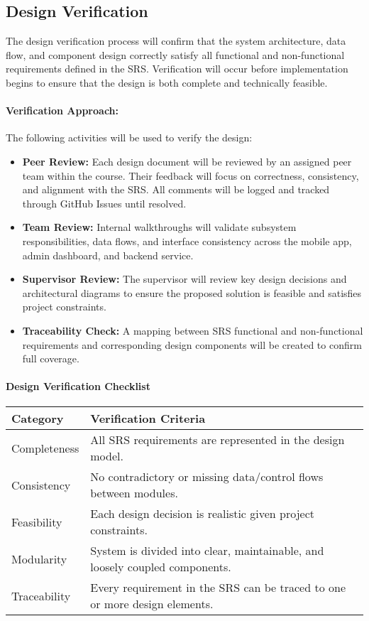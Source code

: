\documentclass[12pt, titlepage]{article}
\begin{document}
\subsection{Design Verification}

The design verification process will confirm that the system architecture, data flow, and component design correctly satisfy all functional and non-functional requirements defined in the SRS. Verification will occur before implementation begins to ensure that the design is both complete and technically feasible.

\paragraph{Verification Approach:}The following activities will be used to verify the design:
\begin{itemize}
    \item \textbf{Peer Review:} Each design document will be reviewed by an assigned peer team within the course. Their feedback will focus on correctness, consistency, and alignment with the SRS. All comments will be logged and tracked through GitHub Issues until resolved.
    \item \textbf{Team Review:} Internal walkthroughs will validate subsystem responsibilities, data flows, and interface consistency across the mobile app, admin dashboard, and backend service.
    \item \textbf{Supervisor Review:} The supervisor will review key design decisions and architectural diagrams to ensure the proposed solution is feasible and satisfies project constraints.
    \item \textbf{Traceability Check:} A mapping between SRS functional and non-functional requirements and corresponding design components will be created to confirm full coverage.
\end{itemize}

\paragraph{Design Verification Checklist}
\begin{center}
\begin{tabular}{|p{4cm}|p{9cm}|}
\hline
\textbf{Category} & \textbf{Verification Criteria} \\ \hline
Completeness & All SRS requirements are represented in the design model. \\ \hline
Consistency & No contradictory or missing data/control flows between modules. \\ \hline
Feasibility & Each design decision is realistic given project constraints. \\ \hline
Modularity & System is divided into clear, maintainable, and loosely coupled components. \\ \hline
Traceability & Every requirement in the SRS can be traced to one or more design elements. \\ \hline
\end{tabular}
\end{center}
\end{document}
